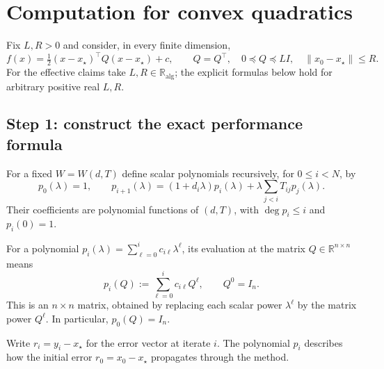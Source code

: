 \documentclass[11pt]{article}
\numberwithin{equation}{section}
\theoremstyle{definition}
\newcommand{\R}{\mathbb R}
\newcommand{\K}{\mathbb R_{\mathrm{alg}}}
\begin{document}
\section{Computation for convex quadratics}
\label{sec:quadratics}
Fix $L,R>0$ and consider, in every finite dimension,
\begin{equation}
 f(x)=\tfrac12(x-x_\star)^\top Q(x-x_\star)+c,\qquad
 Q=Q^\top,\quad 0\preceq Q\preceq LI,\quad \|x_0-x_\star\|\le R.
 \label{eq:quadratic-class}
\end{equation}
For the effective claims take $L,R\in\K$; the explicit formulas below hold for arbitrary positive real $L,R$.

\subsection{Step 1: construct the exact performance formula}
For a fixed $W=W(d,T)$ define scalar polynomials recursively, for $0\le i<N$, by
\begin{equation}
 p_0(\lambda)=1,\qquad
 p_{i+1}(\lambda)=(1+d_i\lambda)p_i(\lambda)
                 +\lambda\sum_{j<i}T_{ij}p_j(\lambda).
 \label{eq:polynomials}
\end{equation}
Their coefficients are polynomial functions of $(d,T)$, with
$\deg p_i\le i$ and $p_i(0)=1$.

For a polynomial $p_i(\lambda)=\sum_{\ell=0}^i c_{i\ell}\lambda^\ell$, its evaluation at the matrix $Q\in\R^{n\times n}$ means
\begin{equation}
 p_i(Q):=\sum_{\ell=0}^i c_{i\ell}Q^\ell,
 \qquad Q^0=I_n.
 \label{eq:matrix-polynomial}
\end{equation}
This is an $n\times n$ matrix, obtained by replacing each scalar power $\lambda^\ell$ by the matrix power $Q^\ell$. In particular, $p_0(Q)=I_n$.

Write $r_i=y_i-x_\star$ for the error vector at iterate $i$. The polynomial $p_i$ describes how the initial error $r_0=x_0-x_\star$ propagates through the method.
\end{document}
